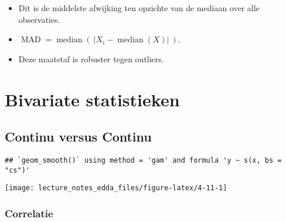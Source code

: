 \documentclass[]{memoir}
\providecommand{\tightlist}{%
  \setlength{\itemsep}{0pt}\setlength{\parskip}{0pt}}
\begin{document}
\begin{itemize}
  \begin{itemize}
  \tightlist
  \item
    Dit is de middelste afwijking ten opzichte van de mediaan over alle
    observaties.
  \item
    \(\operatorname{MAD} = \operatorname{median}\left(\ \left| X_{i} - \operatorname{median} (X) \right|\ \right)\).
  \item
    Deze maatstaf is robuster tegen outliers.
  \end{itemize}
\end{itemize}

\begin{table}[t]

\caption{\label{tab:4-10}Afstand (spreidingsmaten)}
\centering
{}
\end{table}

\section{Bivariate statistieken}\label{bivariate-statistieken}

\subsection{Continu versus Continu}\label{continu-versus-continu}

\begin{verbatim}
## `geom_smooth()` using method = 'gam' and formula 'y ~ s(x, bs = "cs")'
\end{verbatim}

\texttt{[image: lecture\_notes\_edda\_files/figure-latex/4-11-1]}

\subsubsection*{Correlatie}\label{correlatie}
\end{document}

